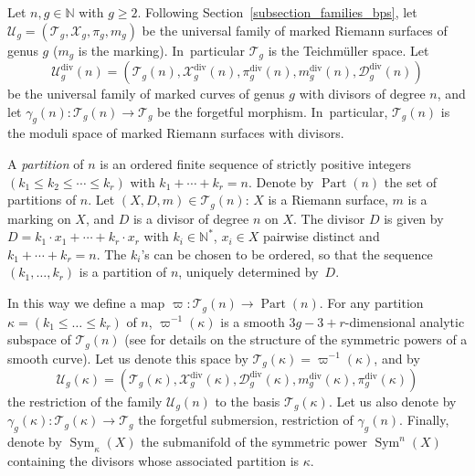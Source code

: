 \documentclass[10pt]{amsart}
\newcommand{\N}{\mathbb N}
\DeclareMathOperator{\Div}{div}
\DeclareMathOperator{\Part}{Part}
\DeclareMathOperator{\Sym}{Sym}
\theoremstyle{definition}
\theoremstyle{plain}
\begin{document}
Let $n, g \in \N$ with $g \ge 2$.
Following Section~\ref{subsection_families_bps}, let $\mathcal U_g = \left(\mathcal T_g, \mathcal X_g, \pi_g, m_g\right)$ be the universal family of marked Riemann surfaces of genus $g$ ($m_g$ is the marking). In~particular $\mathcal T_g$ is the Teichmüller space.
Let
\[
\mathcal U_g^{\Div}(n) = \left(\mathcal T_g(n), \mathcal X_g^{\Div}(n), \pi_g^{\Div}(n), m_g^{\Div}(n), \mathcal D_g^{\Div}(n)\right)
\]
be the universal family of marked curves of genus $g$ with divisors of degree $n$, and let $\gamma_g(n): \mathcal T_g(n) \to \mathcal T_g$ be the forgetful morphism. In~particular, $\mathcal T_g(n)$ is the moduli space of marked Riemann surfaces with divisors.

A \emph{partition} of $n$ is an ordered finite sequence of strictly positive integers $(k_1 \le k_2 \le \cdots \le k_r)$ with $k_1 + \cdots + k_r = n$.
Denote by $\Part(n)$ the set of partitions of $n$.
Let $(X, D, m) \in \mathcal T_g(n)$: $X$ is a Riemann surface, $m$ is a marking on $X$, and $D$ is a divisor of degree $n$ on $X$.
The divisor $D$ is given by $D = k_1 \cdot x_1 + \cdots + k_r \cdot x_r$ with $k_i \in \N^*$, $x_i \in X$ pairwise distinct and $k_1 + \cdots + k_r = n$.
The $k_i$'s can be chosen to be ordered, so that the sequence $(k_1, \dots, k_r)$ is a partition of $n$, uniquely determined by~$D$.

In this way we define a map $\varpi: \mathcal T_g(n) \to \Part(n)$.
For any partition $\kappa = (k_1 \le \dots \le k_r)$ of $n$, $\varpi^{-1}(\kappa)$ is a smooth $3g-3+r$-dimensional analytic subspace of $\mathcal T_g(n)$ (see \cite{barlet-magnusson} for details on the structure of the symmetric powers of a smooth curve).
Let us denote this space by $\mathcal T_g(\kappa) = \varpi^{-1}(\kappa)$, and by
\[
\mathcal U_g(\kappa) = \left(\mathcal T_g(\kappa), \mathcal X_g^{\Div}(\kappa), \mathcal D_g^{\Div}(\kappa), m_g^{\Div}(\kappa), \pi_g^{\Div}(\kappa)\right)
\]
the restriction of the family $\mathcal U_g(n)$ to the basis $\mathcal T_g(\kappa)$.
Let us also denote by $\gamma_g(\kappa): \mathcal T_g(\kappa) \to \mathcal T_g$ the forgetful submersion, restriction of $\gamma_g(n)$.
Finally, denote by $\Sym_{\kappa}(X)$ the submanifold of the symmetric power $\Sym^n(X)$ containing the divisors whose associated partition is $\kappa$.
\end{document}
